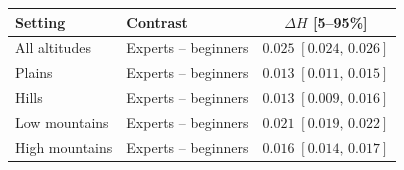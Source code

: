 \begin{tabular}{@{}llc@{}}
\toprule
Setting & Contrast & $\Delta H$ [5--95\%] \\
\midrule
All altitudes & Experts -- beginners & $0.025\;[0.024,\,0.026]$ \\
Plains & Experts -- beginners & $0.013\;[0.011,\,0.015]$ \\
Hills & Experts -- beginners & $0.013\;[0.009,\,0.016]$ \\
Low mountains & Experts -- beginners & $0.021\;[0.019,\,0.022]$ \\
High mountains & Experts -- beginners & $0.016\;[0.014,\,0.017]$ \\
\bottomrule
\end{tabular}
